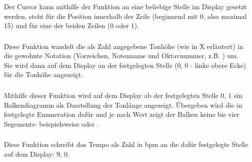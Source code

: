 \subsubsection{}
Der Cursor kann mithilfe der Funktion  an eine beliebige Stelle im Display gesetzt werden.  steht für die Position innerhalb der Zeile (beginnend mit 0, also maximal 15) und  für eine der beiden Zeilen (0 oder 1).

\subsubsection{}
Diese Funktion wandelt die als Zahl angegebene Tonhöhe (wie in X erläutert) %
in die gewohnte Notation (Vorzeichen, Notenname und Oktavnummer, z.B. ) um. Sie wird dann auf dem Display an der festgelegten Stelle (0, 0 - linke obere Ecke) für die Tonhöhe angezeigt.

\subsubsection{}
Mithilfe dieser Funktion wird auf dem Display ab der festgelegten Stelle 0, 1 ein Balkendiagramm als Darstellung der Tonlänge angezeigt. Übergeben wird die in  festgelegte Enumeration dafür und je nach Wert zeigt der Balken keine bis vier Segemente: beispielsweise \lcdtext{[OOO.]} oder \lcdtext{[....]}.

\subsubsection{}
Diese Funktion schreibt das Tempo als Zahl in bpm an die dafür festgelegte Stelle auf dem Display: 9, 0.
